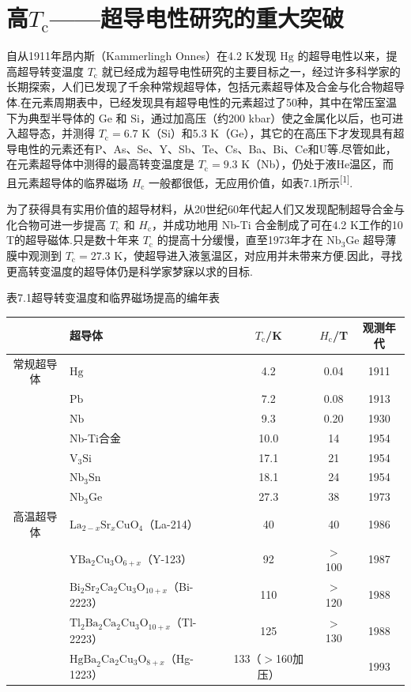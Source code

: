 \section{\texorpdfstring{高$T_{\mathrm{c}}$——超导电性研究的重大突破}{高Tc——超导电性研究的重大突破}}

自从1911年昂内斯（Kammerlingh Onnes）在4.2 K发现 $\mathrm{Hg}$ 的超导电性以来，提高超导转变温度 $T_{\mathrm{c}}$ 就已经成为超导电性研究的主要目标之一，经过许多科学家的长期探索，人们已发现了千余种常规超导体，包括元素超导体及合金与化合物超导体.在元素周期表中，已经发现具有超导电性的元素超过了50种，其中在常压室温下为典型半导体的 $\mathrm{Ge}$ 和 $\mathrm{Si}$，通过加高压（约200 kbar）使之金属化以后，也可进入超导态，并测得 $T_{\mathrm{c}}=6.7$ K（Si）和5.3 K（Ge），其它的在高压下才发现具有超导电性的元素还有P、As、Se、Y、Sb、Te、Cs、Ba、Bi、Ce和U等.尽管如此，在元素超导体中测得的最高转变温度是 $T_{\mathrm{c}}=9.3$ K（Nb），仍处于液He温区，而且元素超导体的临界磁场 $H_{\mathrm{c}}$ 一般都很低，无应用价值，如表7.1所示\textsuperscript{[1]}.

为了获得具有实用价值的超导材料，从20世纪60年代起人们又发现配制超导合金与化合物可进一步提高 $T_{\mathrm{c}}$ 和 $H_{\mathrm{c}}$，并成功地用 Nb-Ti 合金制成了可在4.2 K工作的10 T的超导磁体.只是数十年来 $T_{\mathrm{c}}$ 的提高十分缓慢，直至1973年才在 $\mathrm{Nb}_{3}\mathrm{Ge}$ 超导薄膜中观测到 $T_{\mathrm{c}}=27.3$ K，使超导进入液氢温区，对应用并未带来方便.因此，寻找更高转变温度的超导体仍是科学家梦寐以求的目标.

表7.1\quad 超导转变温度和临界磁场提高的编年表

\begin{center}\small
\begin{tabular}{clccc}
\hline
 & 超导体 & $T_{\mathrm{c}}$/K & $H_{\mathrm{c}}$/T & 观测年代\\
\hline
常规超导体 & $\mathrm{Hg}$ & 4.2 & 0.04 & 1911\\
 & $\mathrm{Pb}$ & 7.2 & 0.08 & 1913\\
 & $\mathrm{Nb}$ & 9.3 & 0.20 & 1930\\
 & Nb-Ti合金 & 10.0 & 14 & 1954\\
 & $\mathrm{V}_{3}\mathrm{Si}$ & 17.1 & 21 & 1954\\
 & $\mathrm{Nb}_{3}\mathrm{Sn}$ & 18.1 & 24 & 1954\\
 & $\mathrm{Nb}_{3}\mathrm{Ge}$ & 27.3 & 38 & 1973\\
\hline
高温超导体 & $\mathrm{La}_{2-x}\mathrm{Sr}_{x}\mathrm{CuO}_{4}$（La-214） & 40 & 40 & 1986\\
 & $\mathrm{YBa}_{2}\mathrm{Cu}_{3}\mathrm{O}_{6+x}$（Y-123） & 92 & $>$100 & 1987\\
 & $\mathrm{Bi}_{2}\mathrm{Sr}_{2}\mathrm{Ca}_{2}\mathrm{Cu}_{3}\mathrm{O}_{10+x}$（Bi-2223） & 110 & $>$120 & 1988\\
 & $\mathrm{Tl}_{2}\mathrm{Ba}_{2}\mathrm{Ca}_{2}\mathrm{Cu}_{3}\mathrm{O}_{10+x}$（Tl-2223） & 125 & $>$130 & 1988\\
 & $\mathrm{HgBa}_{2}\mathrm{Ca}_{2}\mathrm{Cu}_{3}\mathrm{O}_{8+x}$（Hg-1223） & 133（$>$160加压） & & 1993\\
\hline
\end{tabular}
\end{center}

